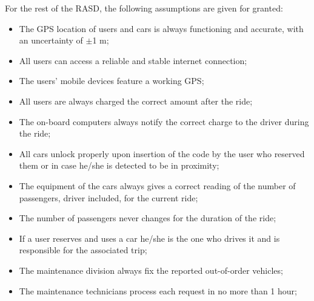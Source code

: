 For the rest of the RASD, the following assumptions are given for granted:

\begin{itemize}
\item The GPS location of users and cars is always functioning and accurate, with an uncertainty of $\pm$1 m; 
\item All users can access a reliable and stable internet connection;
\item The users' mobile devices feature a working GPS;
\item All users are always charged the correct amount after the ride;
\item The on-board computers always notify the correct charge to the driver during the ride;
\item All cars unlock properly upon insertion of the code by the user who reserved them or in case he/she is detected to be in proximity;
\item The equipment of the cars always gives a correct reading of the number of passengers, driver included, for the current ride;
\item The number of passengers never changes for the duration of the ride;
\item If a user reserves and uses a car he/she is the one who drives it and is responsible for the associated trip;
\item The maintenance division always fix the reported out-of-order vehicles;
\item The maintenance technicians process each request in no more than 1 hour;
\end{itemize}